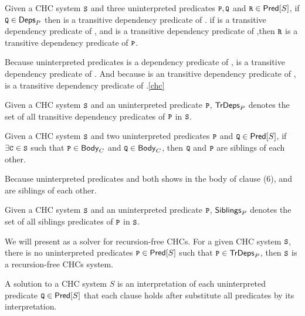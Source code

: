 \begin{defn}
  Given a CHC system $\cc{S}$ and three uninterpreted predicates $\cc{P},
  \cc{Q}$ and $\cc{R} \in \predof{S}$, if $\cc{Q} \in \depsof{P}$ then  is a transitive dependency
  predicate of . 
  if  is a transitive dependency predicate of , and  is a transitive dependency predicate
  of ,then $\cc{R}$ is a transitive dependency predicate of $\cc{P}$.
\end{defn}
%
\begin{ex}
  Because uninterpreted predicates  is a dependency predicate of , 
   is a transitive dependency predicate of .
  And because  is an transitive dependency predicate of , 
   is a transitive dependency predicate of .\autoref{chc}
\end{ex}
%
Given a CHC system $\cc{S}$ and an uninterpreted predicate $\cc{P}$, $\mathsf{TrDeps}_{P}$
denotes the set of all transitive dependency predicates of $\cc{P}$ in $\cc{S}$.
%

\begin{defn}
  Given a CHC system $\cc{S}$ and two uninterpreted predicates $\cc{P}$ and
  $\cc{Q} \in \predof{S}$, if $\exists \cc{C} \in \cc{S}$ such that $\cc{P} \in \bodyof{C}$
  and $\cc{Q} \in \bodyof{C}$, then $\cc{Q}$ and $\cc{P}$ are siblings of each other.
\end{defn}
%
\begin{ex}
  Because uninterpreted predicates  and  both shows in the body of
  clause (6),  and  are siblings of each other.
\end{ex}
%
Given a CHC system $\cc{S}$ and an uninterpreted predicate $\cc{P}$, $\mathsf{Siblings}_{P}$
denotes the set of all siblings predicates of $\cc{P}$ in $\cc{S}$.
%



We will present \sys as a solver for recursion-free CHCs.
%
For a given CHC system $\cc{S}$, there is no uninterpreted predicates $\cc{P} \in \predof{S}$ 
such that $\cc{P} \in \tdepsof{P}$, then $\cc{S}$ is a recursion-free CHCs system.

%
A solution to a CHC system $S$ is an interpretation of each
uninterpreted predicate $\cc{Q} \in \predof{S}$ that each clause holds
after substitute all predicates by its interpretation.

